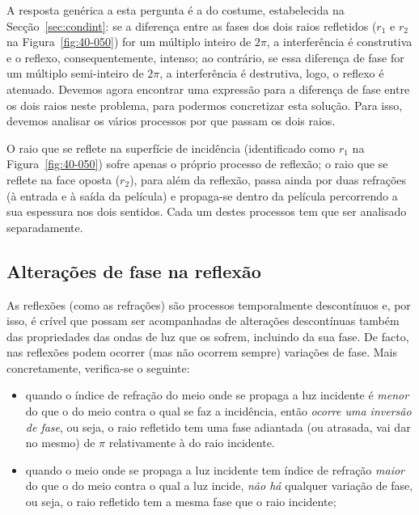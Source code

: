 A resposta genérica a esta pergunta é a do costume, estabelecida na
Secção~\ref{sec:condint}: se a diferença entre as fases dos dois raios
refletidos ($r_1$ e $r_2$ na Figura~\ref{fig:40-050}) for um múltiplo inteiro de
$2\pi$, a interferência é construtiva e o reflexo, consequentemente, intenso; ao
contrário, se essa diferença de fase for um múltiplo semi-inteiro de $2\pi$, a
interferência é destrutiva, logo, o reflexo é atenuado. Devemos agora encontrar
uma expressão para a diferença de fase entre os dois raios neste problema, para
podermos concretizar esta solução. Para isso, devemos analisar os vários
processos por que passam os dois raios.

O raio que se reflete na superfície de incidência (identificado como $r_1$ na
Figura~\ref{fig:40-050}) sofre apenas o próprio processo de reflexão; o raio que
se reflete na face oposta ($r_2$), para além da reflexão, passa ainda por duas
refrações (à entrada e à saída da película) e propaga-se dentro da película
percorrendo a sua espessura nos dois sentidos. Cada um destes processos tem que
ser analisado separadamente.

\subsection*{Alterações de fase na reflexão}
As reflexões (como as refrações) são processos temporalmente descontínuos e,
por isso, é crível que possam ser acompanhadas de alterações descontínuas também
das propriedades das ondas de luz que os sofrem, incluindo da sua fase. De
facto, nas reflexões podem ocorrer (mas não ocorrem sempre) variações de fase.
Mais concretamente, verifica-se o seguinte:
\begin{itemize}
\item
    quando o índice de refração do meio onde se propaga a luz incidente é
    \emph{menor} do que o do meio contra o qual se faz a incidência, então
    \emph{ocorre uma inversão de fase}, ou seja, o raio refletido tem uma fase
    adiantada (ou atrasada, vai dar no mesmo) de $\pi$ relativamente à do raio
    incidente.
\item
    quando o meio onde se propaga a luz incidente tem índice de refração
    \emph{maior} do que o do meio contra o qual a luz incide, \emph{não há}
    qualquer variação de fase, ou seja, o raio refletido tem a mesma fase que o
    raio incidente;
\end{itemize}

